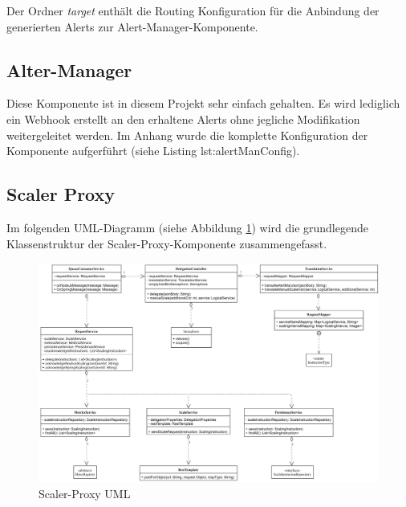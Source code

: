 Der Ordner \emph{target} enthält die Routing Konfiguration für die Anbindung der generierten Alerts zur Alert-Manager-Komponente.

\subsection{Alter-Manager}
Diese Komponente ist in diesem Projekt sehr einfach gehalten. Es wird lediglich ein Webhook erstellt an den erhaltene Alerts ohne jegliche Modifikation weitergeleitet werden. Im Anhang wurde die komplette Konfiguration der Komponente aufgerführt (siehe Listing lst:alertManConfig).


\subsection{Scaler Proxy}

Im folgenden UML-Diagramm (siehe Abbildung \ref{fig:proxyScalerUml}) wird die grundlegende Klassenstruktur der Scaler-Proxy-Komponente zusammengefasst. 

\begin{figure}[ht!]
	\centering
	\includegraphics[width=\linewidth]{kapitel/problemloesung/implementierung/_img/scaler-proxy-uml}
	\caption[Scaler-Proxy UML]{Scaler-Proxy UML}
	\label{fig:proxyScalerUml}
\end{figure}

